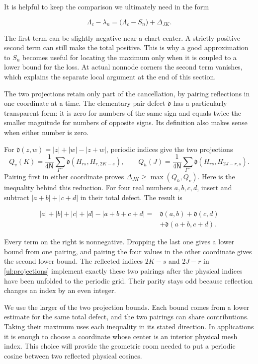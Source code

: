 It is helpful to keep the comparison we ultimately need in the form

\[
 \Lambda_c-\lambda_n
   =\bigl(\Lambda_c-S_n\bigr)+\Delta_{JK}.
\]

The first term can be slightly negative near a chart center.  A
strictly positive second term can still make the total positive.
This is why a good approximation to $S_n$ becomes useful for locating
the maximum only when it is coupled to a lower bound for the loss.
At actual nonnode corners the second term vanishes, which explains
the separate local argument at the end of this section.

The two projections retain only part of the cancellation, by pairing
reflections in one coordinate at a time.  The elementary pair defect
$\mathfrak d$ has a particularly transparent form: it is zero for
numbers of the same sign and equals twice the smaller magnitude for
numbers of opposite signs.  Its definition also makes sense when
either number is zero.

For $\mathfrak d(z,w)=|z|+|w|-|z+w|$, periodic indices give the two projections
\begin{equation}\label{ul:projections}
 Q_v(K)=\frac1{4\mathsf N}\sum_{\Gamma^-}\mathfrak d(H_{rs},H_{r,2K-s}),
 \qquad
 Q_h(J)=\frac1{4\mathsf N}\sum_{\Gamma^-}\mathfrak d(H_{rs},H_{2J-r,s}).
\end{equation}
Pairing first in either coordinate proves
$\Delta_{JK}\geq\max(Q_h,Q_v)$.
Here is the inequality behind this reduction.  For four real numbers
$a,b,c,d$, insert and subtract $|a+b|+|c+d|$ in their total defect.
The result is

\[
 \begin{split}
 |a|+|b|+|c|+|d|-|a+b+c+d|
 ={}&\mathfrak d(a,b)+\mathfrak d(c,d)\\
 &+\mathfrak d(a+b,c+d).
 \end{split}
\]

Every term on the right is nonnegative.  Dropping the last one gives
a lower bound from one pairing, and pairing the four values in the
other coordinate gives the second lower bound.  The reflected indices
$2K-s$ and $2J-r$ in \eqref{ul:projections} implement exactly these
two pairings after the physical indices have been unfolded to the
periodic grid.  Their parity stays odd because reflection changes an
index by an even integer.

We use the larger of the two projection bounds.  Each bound comes
from a lower estimate for the same total defect, and the two pairings
can share contributions.  Taking their maximum uses each inequality
in its stated direction.  In applications it is enough to choose a coordinate whose
center is an interior physical mesh index.  This choice will provide
the geometric room needed to put a periodic cosine between two
reflected physical cosines.

